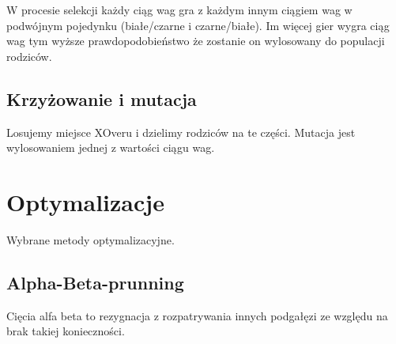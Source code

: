 W procesie selekcji każdy ciąg wag gra z każdym innym ciągiem wag w podwójnym pojedynku (białe/czarne i czarne/białe). Im więcej gier wygra ciąg wag tym wyższe prawdopodobieństwo że zostanie on wylosowany do populacji rodziców.

\subsection{Krzyżowanie i mutacja}

Losujemy miejsce XOveru i dzielimy rodziców na te części. Mutacja jest wylosowaniem jednej z wartości ciągu wag.

\section{Optymalizacje}

{\color{dgray}
Wybrane metody optymalizacyjne.
}

\subsection{Alpha-Beta-prunning}

Cięcia alfa beta to rezygnacja z rozpatrywania innych podgałęzi ze względu na brak takiej konieczności.



